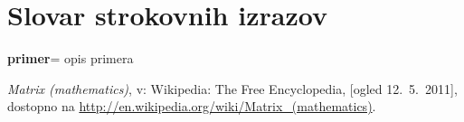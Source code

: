 \documentclass[12pt,a4paper]{amsart}
\theoremstyle{definition} %
\theoremstyle{plain} %
\newcommand{\geslo}[2]{\noindent\textbf{#1}\hspace*{3mm}\hangindent=\parindent\hangafter=1 #2}
\begin{document}
\section*{Slovar strokovnih izrazov}

\geslo{primer}{opis primera}



\begin{thebibliography}{99}

\emph{Matrix (mathematics)}, v: Wikipedia: The Free Encyclopedia, [ogled 12.~5.~2011], dostopno na \url{http://en.wikipedia.org/wiki/Matrix_(mathematics)}.




\end{thebibliography}
\end{document}
